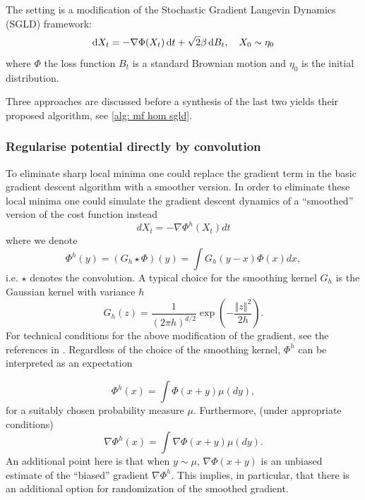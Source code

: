 \documentclass{article}
\begin{document}
The setting is a modification of the Stochastic Gradient Langevin Dynamics (SGLD) framework:
\begin{equation}\label{eq: SGLD}
	\operatorname{d}\! X_{t} = -\nabla \Phi(X_{t})\operatorname{d}\! t + \sqrt{2}\beta \operatorname{d}\!  B_{t}, \quad X_{0}\sim \eta_{0}
\end{equation}
where $ \Phi$ the loss function $ B_{t}$ is a standard Brownian motion and $ \eta_{0}$ is the initial distribution.

Three approaches are discussed before a synthesis of the last two yields their proposed algorithm, see \ref{alg: mf hom sgld}.



\subsubsection{Regularise potential directly by convolution}\label{sec:direct smoothing}

To eliminate sharp local minima one could replace the gradient term
in the basic gradient descent algorithm with a smoother version. In order to
eliminate these local minima one could simulate the gradient descent
dynamics of a ``smoothed'' version of the cost function instead
\begin{equation}
dX_{t}=-\nabla\Phi^{h}(X_{t})dt\label{eq:ode_h}
\end{equation}
where we denote 
\begin{equation}
\Phi^{h}\left(y\right)=(G_{h}\star\Phi)(y)=\int G_{h}(y-x)\Phi(x)dx,\label{eq:integrate phi}
\end{equation}
i.e. $\star$ denotes the convolution. A typical choice for the smoothing
kernel $G_{h}$ is the Gaussian kernel with variance $h$ 
\[
G_{h}(z)=\frac{1}{\left(2\pi h\right)^{d/2}}\exp\left(-\frac{\left\Vert z\right\Vert ^{2}}{2h}\right).
\]
For technical conditions for the above modification of the gradient, see the references in \cite{kantas2019sharpflatshallowweakly}. Regardless
of the choice of the smoothing kernel, $\Phi^{h}$ can be interpreted
as an expectation 

\[
\Phi^{h}\left(x\right)=\int\Phi(x+y)\mu(dy),
\]
for a suitably chosen probability measure $\mu$. Furthermore, (under
appropriate conditions) 
\begin{equation}
\nabla\Phi^{h}\left(x\right)=\int\nabla\Phi(x+y)\mu(dy).\label{eq:smooth_grad}
\end{equation}
An additional point here is that when $y\sim\mu$, $\nabla\Phi(x+y)$
is an unbiased estimate of the ``biased'' gradient $\nabla\Phi^{h}$.
This implies, in particular, that there is an additional option for
randomization of the smoothed gradient.\\ 
\end{document}

